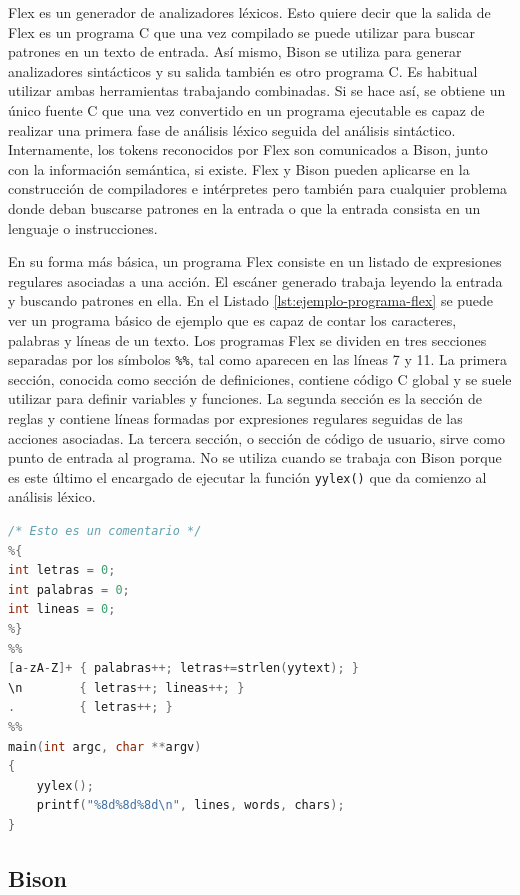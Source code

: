 Flex es un generador de analizadores léxicos. Esto quiere decir que la salida de Flex es un programa C que una vez compilado se puede utilizar para buscar patrones en un texto de entrada. Así mismo, Bison se utiliza para generar analizadores sintácticos y su salida también es otro programa C. Es habitual utilizar ambas herramientas trabajando combinadas. Si se hace así, se obtiene un único fuente C que una vez convertido en un programa ejecutable es capaz de realizar una primera fase de análisis léxico seguida del análisis sintáctico. Internamente, los tokens reconocidos por Flex son comunicados a Bison, junto con la información semántica, si existe. Flex y Bison pueden aplicarse en la construcción de compiladores e intérpretes pero también para cualquier problema donde deban buscarse patrones en la entrada o que la entrada consista en un lenguaje o instrucciones.

En su forma más básica, un programa Flex consiste en un listado de expresiones regulares asociadas a una acción. El escáner generado trabaja leyendo la entrada y buscando patrones en ella. En el Listado \ref{lst:ejemplo-programa-flex} se puede ver un programa básico de ejemplo que es capaz de contar los caracteres, palabras y líneas de un texto. Los programas Flex se dividen en tres secciones separadas por los símbolos \verb|%%|, tal como aparecen en las líneas 7 y 11. La primera sección, conocida como sección de definiciones, contiene código C global y se suele utilizar para definir variables y funciones. La segunda sección es la sección de reglas y contiene líneas formadas por expresiones regulares seguidas de las acciones asociadas. La tercera sección, o sección de código de usuario, sirve como punto de entrada al programa. No se utiliza cuando se trabaja con Bison porque es este último el encargado de ejecutar la función \verb|yylex()| que da comienzo al análisis léxico.

\begin{lstlisting}[language=C,caption={Ejemplo de programa Flex mínimo},label=lst:ejemplo-programa-flex]
/* Esto es un comentario */
%{
int letras = 0;
int palabras = 0;
int lineas = 0;
%}
%%
[a-zA-Z]+ { palabras++; letras+=strlen(yytext); }
\n        { letras++; lineas++; }
.         { letras++; }
%%
main(int argc, char **argv)
{
    yylex();
    printf("%8d%8d%8d\n", lines, words, chars);
}
\end{lstlisting}

\subsection{Bison}

